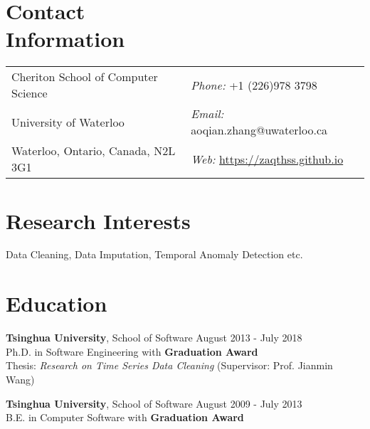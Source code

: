 \documentclass[margin]{cv}
\newenvironment{list1}{
  \begin{list}{\ding{113}}{%
      \setlength{\itemsep}{0in}
      \setlength{\parsep}{0in} \setlength{\pars
      kip}{0in}
      \setlength{\topsep}{0in} \setlength{\partopsep}{0in} 
      \setlength{\leftmargin}{0.17in}}}{\end{list}}
\newenvironment{list2}{
  \begin{list}{$\bullet$}{%
      \setlength{\itemsep}{0in}
      \setlength{\parsep}{0in} \setlength{\parskip}{0in}
      \setlength{\topsep}{0in} \setlength{\partopsep}{0in} 
      \setlength{\leftmargin}{0.2in}}}{\end{list}}
\begin{document}
\begin{resume}
\section{\sc Contact\\ Information}
\vspace{.05in}
\begin{tabular}{@{}p{3.8in}p{3.2in}}
Cheriton School of Computer Science & {\it Phone:}  +1 (226)978 3798 \\            
University of Waterloo   & {\it Email:}  aoqian.zhang@uwaterloo.ca \\
Waterloo, Ontario, Canada, N2L 3G1 & {\it Web:}  \url{https://zaqthss.github.io}\\       

\end{tabular}


\section{\sc Research Interests}

Data Cleaning, Data Imputation, Temporal Anomaly Detection etc.

\section{\sc Education}
{\bf Tsinghua University}, School of Software  \hfill August 2013 - July 2018 \\
Ph.D. in Software Engineering \hfill with \textbf{Graduation Award} \\
Thesis: {\it Research on Time Series Data Cleaning} (Supervisor: Prof. Jianmin Wang)

{\bf Tsinghua University}, School of Software \hfill August 2009 - July 2013 \\
B.E. in Computer Software \hfill with \textbf{Graduation Award} \\



\end{resume}
\end{document}

